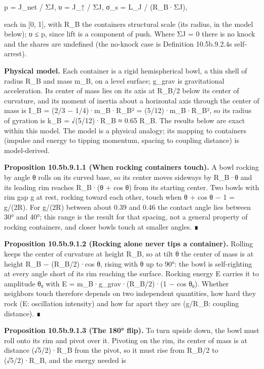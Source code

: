 \documentclass[
]{article}
\begin{document}
p = J\_net / ΣJ, υ = J\_↑ / ΣJ, σ\_s = L\_J / (R\_B·ΣJ),

each in {[}0, 1{]}, with R\_B the container\textquotesingle s structural
scale (its radius, in the model below); υ ≤ p, since lift is a component
of push. Where ΣJ = 0 there is no knock and the shares are undefined
(the no-knock case is Definition 10.5b.9.2.4\textquotesingle s
self-arrest).

\textbf{Physical model.} Each container is a rigid hemispherical bowl, a
thin shell of radius R\_B and mass m\_B, on a level surface; g\_grav is
gravitational acceleration. Its center of mass lies on its axis at
R\_B/2 below its center of curvature, and its moment of inertia about a
horizontal axis through the center of mass is I\_B = (2/3 −
1/4)·m\_B·R\_B² = (5/12)·m\_B·R\_B², so its radius of gyration is k\_B =
√(5/12)·R\_B ≈ 0.65 R\_B. The results below are exact within this model.
The model is a physical analogy; its mapping to containers (impulse and
energy to tipping momentum, spacing to coupling distance) is
model-derived.

\textbf{Proposition 10.5b.9.1.1 (When rocking containers touch).} A bowl
rocking by angle θ rolls on its curved base, so its center moves
sideways by R\_B·θ and its leading rim reaches R\_B·(θ + cos θ) from its
starting center. Two bowls with rim gap g at rest, rocking toward each
other, touch when θ + cos θ − 1 = g/(2R). For g/(2R) between about 0.39
and 0.46 the contact angle lies between 30° and 40°; this range is the
result for that spacing, not a general property of rocking containers,
and closer bowls touch at smaller angles. ∎

\textbf{Proposition 10.5b.9.1.2 (Rocking alone never tips a container).}
Rolling keeps the center of curvature at height R\_B, so at tilt θ the
center of mass is at height R\_B − (R\_B/2)·cos θ, rising with θ up to
90°: the bowl is self-righting at every angle short of its rim reaching
the surface. Rocking energy E carries it to amplitude θ₀ with E =
m\_B·g\_grav·(R\_B/2)·(1 − cos θ₀). Whether neighbors touch therefore
depends on two independent quantities, how hard they rock (E:
oscillation intensity) and how far apart they are (g/R\_B: coupling
distance). ∎

\textbf{Proposition 10.5b.9.1.3 (The 180° flip).} To turn upside down,
the bowl must roll onto its rim and pivot over it. Pivoting on the rim,
its center of mass is at distance (√5/2)·R\_B from the pivot, so it must
rise from R\_B/2 to (√5/2)·R\_B, and the energy needed is
\end{document}
